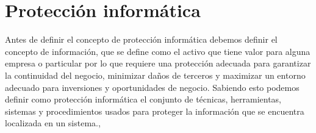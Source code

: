 \chapter{Protección informática}
\label{cha:proteccion-informatica}
Antes de definir el concepto de protección informática debemos definir el concepto de información, que se define como el activo que tiene valor para alguna empresa o particular por lo que requiere una protección adecuada para garantizar la continuidad del negocio, minimizar daños de terceros y maximizar un entorno adecuado para inversiones y oportunidades de negocio. Sabiendo esto podemos definir como protección informática el conjunto de técnicas, herramientas, sistemas y procedimientos usados para proteger la información que se encuentra localizada en un sistema.\cite{info},\cite{proteccion} 
